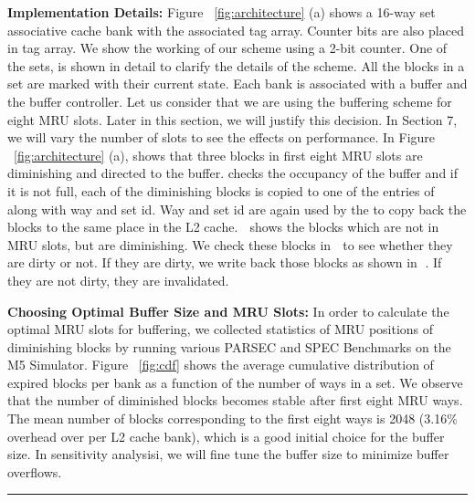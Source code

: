\noindent\textbf{Implementation Details:}
Figure ~\ref{fig:architecture} (a) shows a 16-way set associative cache bank with the associated tag array.
Counter bits are also placed in tag array. We show the working of
our scheme using a 2-bit counter.  One of the sets, is shown in detail to clarify the details of the scheme.
All the blocks in a set are marked with their current state. Each bank is  associated with a buffer and the buffer controller.
Let us consider that we are using the buffering scheme for eight MRU slots. Later in 
this section, we will justify this decision. In Section 7, we will vary the number of slots to see the effects on performance. 
In Figure  ~\ref{fig:architecture} (a),  shows that three blocks in first eight MRU slots are diminishing and directed to the buffer.  checks
the occupancy of the buffer and if it is not full, each of the diminishing blocks is copied to one of the entries
of  along with way and set id. Way and set id are again used by the   to copy back the blocks to
the same place in the L2 cache. \textcircled{\raisebox{-.9pt}{A}} shows the blocks which are not in MRU slots,
but are diminishing. We check these blocks in \textcircled{\raisebox{-.9pt}{B}} to see whether they are dirty or not.
If they are dirty, we write back those blocks as shown in \textcircled{\raisebox{-.9pt}{C}}.  If they are not dirty, they are invalidated.

\noindent\textbf{Choosing Optimal Buffer  Size and MRU Slots:}
In order to calculate the optimal MRU slots for buffering, we collected statistics of MRU positions of diminishing blocks
by running various PARSEC and SPEC Benchmarks on the M5 Simulator. 
Figure ~\ref{fig:cdf} shows the average cumulative distribution of expired blocks per bank 
as a function of the number of ways in a set. We observe that the number of diminished blocks becomes stable
after first eight MRU ways. The mean number of blocks corresponding to the first eight ways is 2048
(3.16\% overhead over per L2 cache bank),
which is a good initial choice for the buffer size. In sensitivity analysisi, we will fine tune the buffer size
to minimize buffer overflows. 


\begin{figure*} [t]
\centering
 \hrule
 \caption{\label{fig:cdf} \scriptsize \bf Cumulative Distribution of Dead Blocks per Bank with number of ways.}
\end{figure*}


